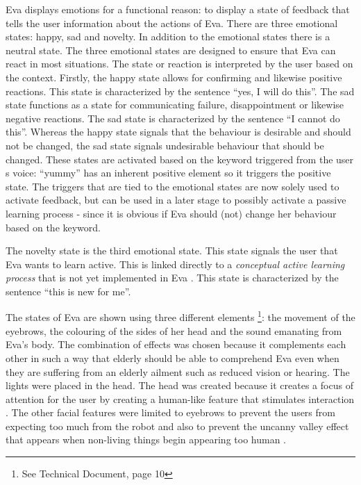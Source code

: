 \documentclass[project_eva.tex]{subfiles}
\begin{document}
Eva displays emotions for a functional reason: to display a state of feedback that tells the user information about the 
actions of Eva. There are three emotional states: happy, sad and novelty. In  addition to the emotional states there is a 
neutral state. The three emotional states are designed to ensure that Eva can react in most situations. The state or 
reaction is interpreted by the user based on the context. Firstly, the happy  state allows for confirming and likewise 
positive reactions. This state is characterized by the sentence ``yes, I will do this''. The sad state functions as a 
state for communicating failure, disappointment or likewise negative reactions. The sad state is characterized by the 
sentence ``I cannot do this''.  Whereas the happy state signals that the behaviour is desirable and should not be 
changed, the sad state signals undesirable behaviour that should be changed. These states are activated based on the 
keyword triggered from the user \textquotesingle s voice: ``yummy'' has an inherent positive element so it triggers the 
positive state. The triggers that are tied to the emotional states are now solely used to activate feedback, but can be 
used in a later stage to possibly activate a passive learning process - since it is obvious if Eva should (not) change 
her behaviour based on the keyword.

The novelty state is the third emotional state. This state signals the user that Eva wants to learn active. This is 
linked 
directly to a \textit{conceptual active learning process} that is not yet implemented in Eva \pageref{sec:Concept}. This 
state is characterized by the sentence ``this is new for me''.

The states of Eva are shown using three different elements \footnote{See Technical Document, page 10}: the movement of the 
eyebrows, the colouring of the sides of her head  and the sound emanating from Eva’s body. The combination of effects was 
chosen because it complements each other in such a way that elderly should be able to comprehend Eva even when they are 
suffering from an elderly ailment such as reduced vision or hearing. The lights were placed in the head. The head was 
created because it creates a focus of attention for the user by creating a human-like feature that stimulates interaction 
\cite{elderly}. The other facial features were limited to eyebrows to prevent the users from expecting too much from the 
robot and also to prevent the uncanny valley effect that appears when non-living things begin appearing too human 
\cite{uncanny}. 
\end{document}
